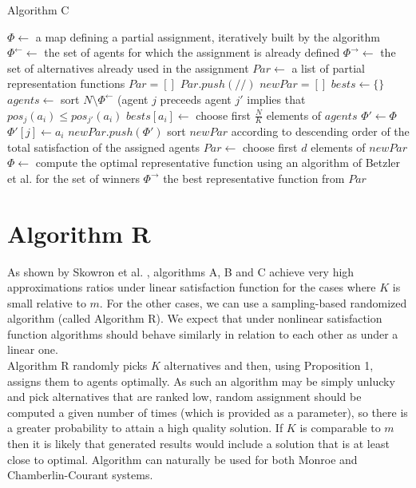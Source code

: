\begin{algorithm}
\caption{Algorithm C}\label{euclid}
\begin{algorithmic}[1]
		\State $\Phi \gets$ a map defining a partial assignment, iteratively built by the algorithm
		\State $\Phi^{\leftarrow} \gets$ the set of agents for which the assignment is already defined
		\State $\Phi^{\rightarrow} \gets$ the set of alternatives already used in the assignment
		\State $Par \gets$ a list of partial representation functions
		\State $Par = []$
		\State $Par.push(/{/})$
			\State $newPar = []$
				\State $bests \gets \{\}$
					\State $agents \gets$ sort $N \setminus \Phi^{\leftarrow}$ (agent $j$ preceeds agent $j'$ implies that $pos_{j}(a_{i}) \leq pos_{j'}(a_{i})$
					\State $bests[a_{i}] \gets$ choose first $\frac{N}{K}$ elements of $agents$
					\State $\Phi' \gets \Phi$
						\State $\Phi'[j] \gets a_{i}$
					\EndFor
					\State $newPar.push(\Phi')$
				\EndFor
			\EndFor
			\State sort $newPar$ according to descending order of the total satisfaction of the assigned agents
			\State $Par \gets$ choose first $d$ elements of $newPar$
		\EndFor
			\State $\Phi \gets$ compute the optimal representative function using an algorithm of Betzler et al. \cite{3} for the set of winners $\Phi^{\rightarrow}$
		\EndFor
		\State \Return the best representative function from $Par$
	\EndProcedure
\end{algorithmic}
\end{algorithm}

\section{Algorithm R}

As shown by Skowron et al. \cite{1}, algorithms A, B and C achieve very high approximations ratios under linear satisfaction function for the cases where $K$ is small relative to $m$. For the other cases, we can use a sampling-based randomized algorithm (called Algorithm R). We expect that under nonlinear satisfaction function algorithms should behave similarly in relation to each other as under a linear one.
\\

Algorithm R randomly picks $K$ alternatives and then, using Proposition 1, assigns them to agents optimally. As such an algorithm may be simply unlucky and pick alternatives that are ranked low, random assignment should be computed a given number of times (which is provided as a parameter), so there is a greater probability to attain a high quality solution. If $K$ is comparable to $m$ then it is likely that generated results would include a solution that is at least close to optimal. Algorithm can naturally be used for both Monroe and Chamberlin-Courant systems.


